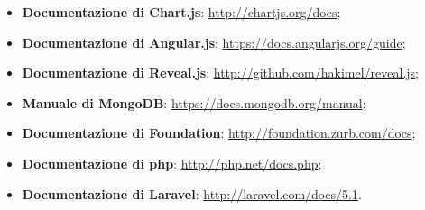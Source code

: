 \begin{itemize}
\begin{itemize}
\begin{itemize}
\begin{itemize}
						\end{itemize}
					\end{itemize}
					\item \textbf{Documentazione di \gls{Chart.js}}: \url{http://chartjs.org/docs};
					\item \textbf{Documentazione di \gls{Angular}.js}: \url{https://docs.angularjs.org/guide};
					\item \textbf{Documentazione di \gls{Reveal.js}}: \url{http://github.com/hakimel/reveal.js};
					\item \textbf{Manuale di \gls{MongoDB}}: \url{https://docs.mongodb.org/manual};
					\item \textbf{Documentazione di Foundation}: \url{http://foundation.zurb.com/docs};
 					\item \textbf{Documentazione di \gls{php}}: \url{http://php.net/docs.php};
 					\item \textbf{Documentazione di \gls{Laravel}}: \url{http://laravel.com/docs/5.1}.
				\end{itemize}

	\end{itemize}
